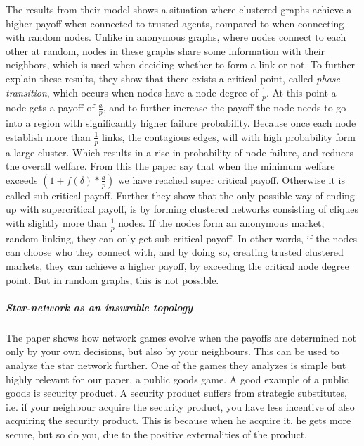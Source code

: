 The results from their model shows a situation where clustered graphs achieve a higher payoff when connected to trusted agents, compared to when connecting with random nodes. Unlike in anonymous graphs, where nodes connect to each other at random, nodes in these graphs share some information with their neighbors, which is used when deciding whether to form a link or not. 
To further explain these results, they show that there exists a critical point, called \textit{phase transition}, which occurs when nodes have a node degree of $\frac{1}{p}$. 
At this point a node gets a payoff of  $\frac{a}{p}$, and to further increase the payoff the node needs to go into a region with significantly higher failure probability. 
Because once each node establish more than $\frac{1}{p}$ links, the contagious edges, will with high probability form a large cluster. Which results in a rise in probability of node failure, and reduces the overall welfare.
From this the paper say that when the minimum welfare exceeds 
$(1+f(\delta)*\frac{a}{p})$
we have reached super critical payoff. Otherwise it is called sub-critical payoff. 
Further they show that the only possible way of ending up with supercritical payoff, is by forming clustered networks consisting of cliques with slightly more than $\frac{1}{p}$ nodes. 
If the nodes form an anonymous market, random linking, they can only get sub-critical payoff. 
In other words, if the nodes can choose who they connect with, and by doing so, creating trusted clustered markets, they can achieve a higher payoff, by exceeding the critical node degree point. But in random graphs, this is not possible. 


\subparagraph{Star-network as an insurable topology}
The paper \cite{networkgames} shows how network games evolve when the payoffs are determined not only by your own decisions, but also by your neighbours. This can be used to analyze the star network further. One of the games they analyzes is simple but highly relevant for our paper, a public goods game. A good example of a public goods is security product. A security product  suffers from strategic substitutes, i.e. if your neighbour acquire the security product, you have less incentive of also acquiring the security product. This is because when he acquire it, he gets more secure, but so do you, due to the positive externalities of the product.

